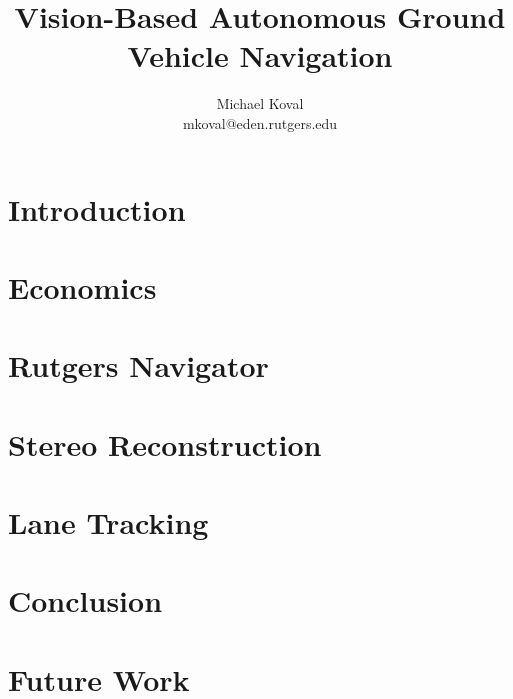 \documentclass[11pt,twocolumn]{article}
\title{Vision-Based Autonomous Ground Vehicle Navigation}
\date{}
\author{
	Michael Koval \\
	mkoval@eden.rutgers.edu
}
\begin{document}
\maketitle

\section{Introduction}
\label{sec:intro}

\section{Economics}
\label{sec:econ}

\section{Rutgers Navigator}

\section{Stereo Reconstruction}
\label{sec:stereo}

\section{Lane Tracking}
\label{sec:lane}

\section{Conclusion}
\label{sec:conclusion}

\section{Future Work}
\label{sec:future}
\end{document}

